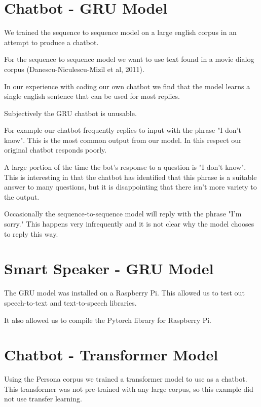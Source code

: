 \section{Chatbot - GRU Model}
We trained the sequence to sequence model on a large english
corpus in an attempt to produce a chatbot. 

For the sequence to sequence model we want to use text found in a movie dialog corpus (Danescu-Niculescu-Mizil et al, 2011)\cite{Danescu-Niculescu-Mizil+Lee:11a}. 

In our experience with coding our own chatbot 
we find that the model learns a single english sentence that can be used for most replies. 

Subjectively the GRU chatbot is unusable.

For example our chatbot frequently replies to input with the phrase "I don't know". This is the most common output from our model. In this respect our original chatbot responds poorly.

A large portion of the time the bot's 
response to a question is "I don't know". This is interesting in that the chatbot has identified that this phrase is a suitable answer to many questions, but it is disappointing that there isn't more variety to the output.  

Occasionally the sequence-to-sequence model will reply with the phrase "I'm sorry." This happens
very infrequently and it is not clear why the model chooses to reply this way. 

\section{Smart Speaker - GRU Model}

The GRU model was installed on a Raspberry Pi. This allowed us to test out speech-to-text and 
text-to-speech libraries. 

It also allowed us to compile the Pytorch library for Raspberry Pi.



\section{Chatbot - Transformer Model}
Using the Persona corpus we trained a transformer model to use as a chatbot. This transformer was not pre-trained with any large corpus, so this example did not use transfer learning. 

